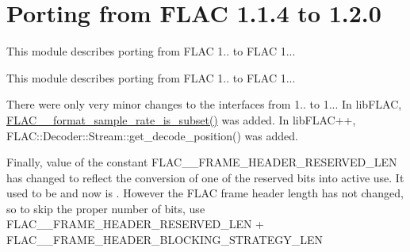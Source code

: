 \hypertarget{group__porting__1__1__4__to__1__2__0}{}\section{Porting from F\+L\+AC 1.1.4 to 1.2.0}
\label{group__porting__1__1__4__to__1__2__0}


This module describes porting from F\+L\+AC 1.. to F\+L\+AC 1...  


This module describes porting from F\+L\+AC 1.. to F\+L\+AC 1... 

There were only very minor changes to the interfaces from 1.. to 1... In lib\+F\+L\+AC, {\ttfamily \mbox{\hyperlink{group__flac__format_ga996f8732a2502ad79a68bb4a9f945235}{F\+L\+A\+C\+\_\+\+\_\+format\+\_\+sample\+\_\+rate\+\_\+is\+\_\+subset()}}} was added. In lib\+F\+L\+A\+C++, {\ttfamily F\+L\+A\+C\+::\+Decoder\+::\+Stream\+::get\+\_\+decode\+\_\+position()} was added.

Finally, value of the constant {\ttfamily F\+L\+A\+C\+\_\+\+\_\+\+F\+R\+A\+M\+E\+\_\+\+H\+E\+A\+D\+E\+R\+\_\+\+R\+E\+S\+E\+R\+V\+E\+D\+\_\+\+L\+EN} has changed to reflect the conversion of one of the reserved bits into active use. It used to be {} and now is {}. However the F\+L\+AC frame header length has not changed, so to skip the proper number of bits, use {\ttfamily F\+L\+A\+C\+\_\+\+\_\+\+F\+R\+A\+M\+E\+\_\+\+H\+E\+A\+D\+E\+R\+\_\+\+R\+E\+S\+E\+R\+V\+E\+D\+\_\+\+L\+EN} + {\ttfamily F\+L\+A\+C\+\_\+\+\_\+\+F\+R\+A\+M\+E\+\_\+\+H\+E\+A\+D\+E\+R\+\_\+\+B\+L\+O\+C\+K\+I\+N\+G\+\_\+\+S\+T\+R\+A\+T\+E\+G\+Y\+\_\+\+L\+EN} 